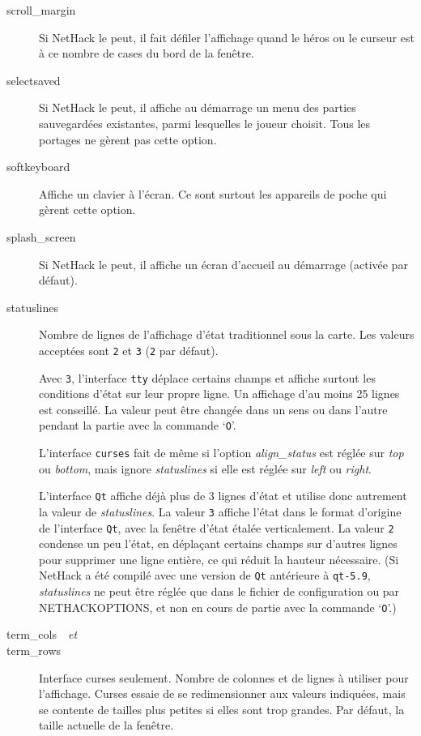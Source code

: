 \documentclass[titlepage]{article}
\begin{document}
\begin{description}
\item[{scroll\_margin}]
Si NetHack le peut, il fait défiler l'affichage quand le héros ou le curseur
est à ce nombre de cases du bord de la fenêtre.

\item[{selectsaved}]
Si NetHack le peut, il affiche au démarrage un menu des parties
sauvegardées existantes, parmi lesquelles le joueur choisit.
Tous les portages ne gèrent pas cette option.

\item[{softkeyboard}]
Affiche un clavier à l'écran.
Ce sont surtout les appareils de poche qui gèrent cette option.

\item[{splash\_screen}]
Si NetHack le peut, il affiche un écran d'accueil au démarrage (activée
par défaut).

\item[{statuslines}]
Nombre de lignes de l'affichage d'état traditionnel sous la carte.
Les valeurs acceptées sont \texttt{2} et \texttt{3} (\texttt{2} par défaut).


Avec \texttt{3}, l'interface \texttt{tty} déplace certains champs et affiche
surtout les conditions d'état sur leur propre ligne.
Un affichage d'au moins 25 lignes est conseillé.
La valeur peut être changée dans un sens ou dans l'autre pendant la partie
avec la commande `\texttt{O}'.


L'interface \texttt{curses} fait de même si l'option
\textit{align\_status}
est réglée sur \textit{top} ou \textit{bottom}, mais ignore
\textit{statuslines}
si elle est réglée sur \textit{left} ou \textit{right}.


L'interface \texttt{Qt} affiche déjà plus de 3 lignes d'état et utilise donc
autrement la valeur de
\textit{statuslines}.
La valeur \texttt{3} affiche l'état dans le format d'origine de l'interface
\texttt{Qt}, avec la fenêtre d'état étalée verticalement.
La valeur \texttt{2} condense un peu l'état, en déplaçant certains champs sur
d'autres lignes pour supprimer une ligne entière, ce qui réduit la hauteur
nécessaire.
(Si NetHack a été compilé avec une version de \texttt{Qt} antérieure à
\texttt{qt-5.9},
\textit{statuslines}
ne peut être réglée que dans le fichier de configuration ou par
NETHACKOPTIONS, et non en cours de partie avec la commande
`\texttt{O}'.)

\item[{term\_cols~~\textit{et}}]

\item[{term\_rows}]
Interface curses seulement.
Nombre de colonnes et de lignes à utiliser pour l'affichage.
Curses essaie de se redimensionner aux valeurs indiquées, mais se contente
de tailles plus petites si elles sont trop grandes.
Par défaut, la taille actuelle de la fenêtre.


\end{description}
\end{document}
